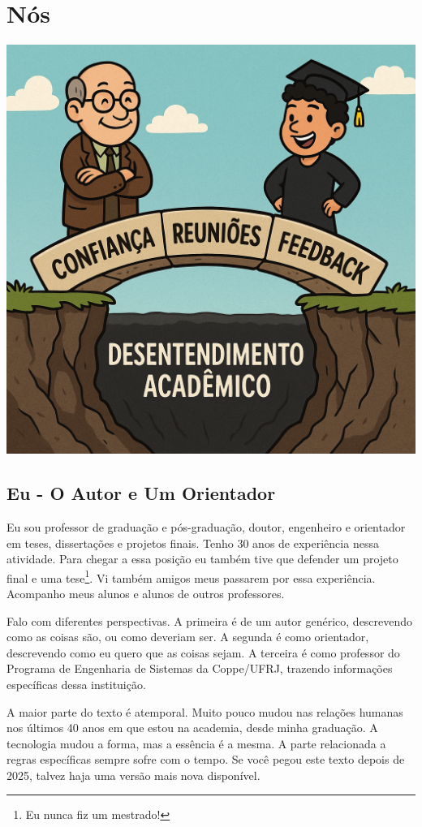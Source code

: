 \chapter{Nós}

\begin{center}
\includegraphics[width=0.5\linewidth]{Images/nos.png}    
\end{center}
\vspace{0.5cm}

\section{Eu - O Autor e Um Orientador}

Eu sou professor de graduação e pós-graduação, doutor, engenheiro e orientador em teses, dissertações e projetos finais. Tenho 30 anos de experiência nessa atividade. Para chegar a essa posição eu também tive que defender um projeto final e uma tese\footnote{Eu nunca fiz um mestrado!}. Vi também amigos meus passarem por essa experiência. Acompanho meus alunos e alunos de outros professores.

Falo com diferentes perspectivas. A primeira é de um autor genérico, descrevendo como as coisas são, ou como deveriam ser. A segunda é como orientador, descrevendo como eu quero que as coisas sejam. A terceira é como professor do Programa de Engenharia de Sistemas da Coppe/UFRJ, trazendo informações específicas dessa instituição.

A maior parte do texto é atemporal. Muito pouco mudou nas relações humanas nos últimos 40 anos em que estou na academia, desde minha graduação. A tecnologia mudou a forma, mas a essência é a mesma. A parte relacionada a regras específicas sempre sofre com o tempo. Se você pegou este texto depois de 2025, talvez haja uma versão mais nova disponível. 



